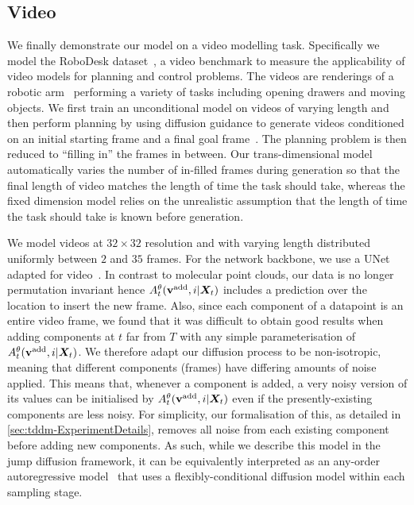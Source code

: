 \subsection{Video}

We finally demonstrate our model on a video modelling task. Specifically we model the RoboDesk dataset~\citep{tian2023control}, a video benchmark to measure the applicability of video models for planning and control problems. The videos are renderings of a robotic arm~\citep{kannan2021robodesk} performing a variety of tasks including opening drawers and moving objects.
We first train an unconditional model on videos of varying length and then perform planning by using diffusion guidance to generate videos conditioned on an initial starting frame and a final goal frame~\citep{janner2022diffuser}. The planning problem is then reduced to ``filling in'' the frames in between. Our trans-dimensional model automatically varies the number of in-filled frames during generation so that the final length of video matches the length of time the task should take, whereas the fixed dimension model relies on the unrealistic assumption that the length of time the task should take is known before generation.

We model videos at $32 \times 32$ resolution and with varying length distributed uniformly between $2$ and $35$ frames. For the network backbone, we use a UNet adapted for video~\citep{harvey2022flexible}. In contrast to molecular point clouds, our data is no longer permutation invariant hence $A_t^\theta({\mathbf{v}}^{\textup{add}}, i | {\bm{X}}_t)$ includes a prediction over the location to insert the new frame. Also, since each component of a datapoint is an entire video frame, we found that it was difficult to obtain good results when adding components at $t$ far from $T$ with any simple parameterisation of $A_t^\theta({\mathbf{v}}^{\textup{add}}, i | {\bm{X}}_t)$. We therefore adapt our diffusion process to be non-isotropic, meaning that different components (frames) have differing amounts of noise applied. This means that, whenever a component is added, a very noisy version of its values can be initialised by $A_t^\theta({\mathbf{v}}^{\textup{add}}, i | {\bm{X}}_t)$ even if the presently-existing components are less noisy. For simplicity, our formalisation of this, as detailed in \cref{sec:tddm-ExperimentDetails}, removes all noise from each existing component before adding new components. As such, while we describe this model in the jump diffusion framework, it can be equivalently interpreted as an any-order autoregressive model~\citep{shih2022training} that uses a flexibly-conditional diffusion model within each sampling stage. 

